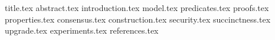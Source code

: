 \documentclass[11pt]{llncs}
\begin{document}
{title.tex}
\thispagestyle{plain}
{abstract.tex}
{introduction.tex}
{model.tex}
{predicates.tex}
{proofs.tex}
{properties.tex}
{consensus.tex}
{construction.tex}
{security.tex}
{succinctness.tex}
{upgrade.tex}
{experiments.tex}
{references.tex}
\end{document}
